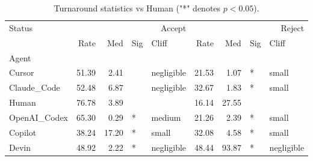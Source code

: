 \begin{table}
\caption{Turnaround statistics vs Human ("*" denotes $p<0.05$).}
\label{tab:turnaround_enhanced}
\begin{tabular}{lrrllrrll}
\toprule
Status & \multicolumn{4}{r}{Accept} & \multicolumn{4}{r}{Reject} \\
 & Rate & Med & Sig & Cliff & Rate & Med & Sig & Cliff \\
Agent &  &  &  &  &  &  &  &  \\
\midrule
Cursor & 51.39 & 2.41 &  & negligible & 21.53 & 1.07 & * & small \\
Claude_Code & 52.48 & 6.87 &  & negligible & 32.67 & 1.83 & * & small \\
Human & 76.78 & 3.89 &  &  & 16.14 & 27.55 &  &  \\
OpenAI_Codex & 65.30 & 0.29 & * & medium & 21.26 & 2.39 & * & small \\
Copilot & 38.24 & 17.20 & * & small & 32.08 & 4.58 & * & small \\
Devin & 48.92 & 2.22 & * & negligible & 48.44 & 93.87 & * & negligible \\
\bottomrule
\end{tabular}
\end{table}
